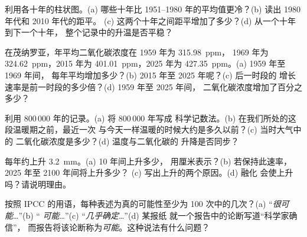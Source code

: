 \begin{exercise}[$\star\star$]\label{exo:g9:climate-past-and-present:5}
利用各十年的柱状图。(a) 哪些十年比
1951--1980 年的平均值更冷？(b) 读出 1980 年代和 2010 年代的距平。
(c) 这两个十年之间距平增加了多少？(d) 从一个十年到下一个十年，
整个记录中的升温是否平稳？
\end{exercise}

\begin{exercise}[$\star\star$]\label{exo:g9:climate-past-and-present:6}
在茂纳罗亚，年平均二氧化碳浓度在 1959 年为 \qty{315.98}{ppm}，
1969 年为 \qty{324.62}{ppm}，2015 年为 \qty{401.01}{ppm}，2025 年为 \qty{427.35}{ppm}。(a) 1959 年至 1969 年间，
每年平均增加多少？(b) 2015 年至 2025 年呢？(c) 后一时段的
增长速率是前一时段的多少倍？(d) 1959 年至 2025 年间，
二氧化碳浓度增加了百分之多少？
\end{exercise}

\begin{exercise}[$\star\star$]\label{exo:g9:climate-past-and-present:7}
利用 800\,000 年的记录。(a) 将 800\,000 年写成
科学记数法。(b) 在我们所处的这段温暖期之前，最近一次
与今天一样温暖的时候大约是多久以前？(c) 当时大气中的
二氧化碳浓度是多少？(d) 温度与二氧化碳的
升降是否同步？
\end{exercise}

\begin{exercise}[$\star\star$]\label{exo:g9:climate-past-and-present:8}
每年约上升 \qty{3.2}{mm}。(a) 10 年间上升多少，
用厘米表示？(b) 若保持此速率，2025 年至 2100 年间将上升多少？
(c) 写出上升的两个原因。(d) 融化
会使上升吗？请说明理由。
\end{exercise}

\begin{exercise}[$\star\star$]\label{exo:g9:climate-past-and-present:9}
按照 IPCC 的用语，每种表述为真的可能性至少为
100 次中的几次？(a) “\emph{很可能}\ldots”(b) “
\emph{可能}\ldots”(c) “\emph{几乎确定}\ldots”(d) 某报纸
就一个报告中的论断写道“科学家确信”，
而报告将该论断称为\emph{可能}。这种说法有什么问题？
\end{exercise}

